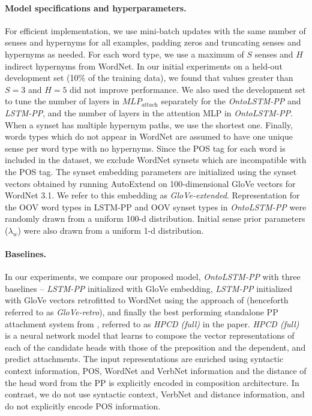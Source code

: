 \paragraph{Model specifications and hyperparameters.} 
For efficient implementation, we use mini-batch updates with the same number of senses and hypernyms for all examples, padding zeros and truncating senses and hypernyms as needed.
For each word type, we use a maximum of $S$ senses and $H$ indirect hypernyms from WordNet.
In our initial experiments on a held-out development set (10\% of the training data), we found that values greater than $S=3$ and $H=5$ did not improve performance. We also used the development set to tune the number of layers in $\textit{MLP}_{\textit{attach}}$ separately for the \textit{OntoLSTM-PP} and \textit{LSTM-PP}, and the number of layers in the attention MLP in \textit{OntoLSTM-PP}.
When a synset has multiple hypernym paths, we use the shortest one. 
Finally, words types which do not appear in WordNet are assumed to have one unique sense per word type with no hypernyms. Since the POS tag for each word is included in the dataset, we exclude WordNet synsets which are incompatible with the POS tag.
The synset embedding parameters are initialized using the synset vectors obtained by running AutoExtend \citep{rothe:15} on 100-dimensional GloVe \citep{pennington2014glove} vectors for WordNet 3.1. We refer to this embedding as \textit{GloVe-extended}. Representation for the OOV word types in LSTM-PP and OOV synset types in \textit{OntoLSTM-PP} were randomly drawn from a uniform 100-d distribution. 
Initial sense prior parameters ($\lambda_w$) were also drawn from a uniform 1-d distribution.

\paragraph{Baselines.} In our experiments, we compare our proposed model, \textit{OntoLSTM-PP} with three baselines -- \textit{LSTM-PP} initialized with GloVe embedding, \textit{LSTM-PP} initialized with GloVe vectors retrofitted to WordNet using the approach of \cite{faruqui:15} (henceforth referred to as \textit{GloVe-retro}), and finally the best performing standalone PP attachment system from \cite{belinkov2014exploring}, referred to as \textit{HPCD (full)} in the paper. \textit{HPCD (full)} is a neural network model that learns to compose the vector representations of each of the candidate heads with those of the preposition and the dependent, and predict attachments. The input representations are enriched using syntactic context information, POS, WordNet and VerbNet \citep{kipper2008large} information and the distance of the head word from the PP is explicitly encoded in composition architecture. In contrast, we do not use syntactic context, VerbNet and distance information, and do not explicitly encode POS information.

